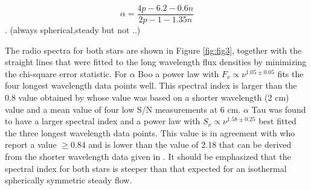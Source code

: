 \documentclass[iop]{emulateapj}
\begin{document}
\begin{equation}
\alpha = \frac{4p -6.2 -0.6n}{2p-1-1.35n}
\label{eq:eq1}
\end{equation}
\citep[e.g.,][]{1987ApJ...312..813S}. (always spherical,steady but not ..)

The radio spectra for both stars are shown in Figure \ref{fig:fig3}, together with the straight lines that were fitted to the long wavelength flux densities by minimizing the chi-square error statistic. For $\alpha$ Boo a power law with $F_{\nu} \propto \nu ^{1.05 \pm 0.05}$ fits the four longest wavelength data points well. This spectral index is larger than the 0.8 value obtained by \cite{1986AJ.....91..602D} whose value was based on a shorter wavelength (2 cm) value and a mean value of four low S/N measurements at 6 cm. $\alpha$ Tau was found to have a larger spectral index and a power law with $S_{\nu} \propto \nu ^{1.58 \pm 0.25}$ best fitted the three longest wavelength data points. This value is in agreement with \cite{1986AJ.....91..602D} who report a value $\ge 0.84$ and is lower than the value of 2.18 that can be derived from the shorter wavelength data given in \cite{2007ApJ...655..946W}. It should be emphasized that the spectral index for both stars is steeper than that expected for an isothermal spherically symmetric steady flow. 
\end{document}

